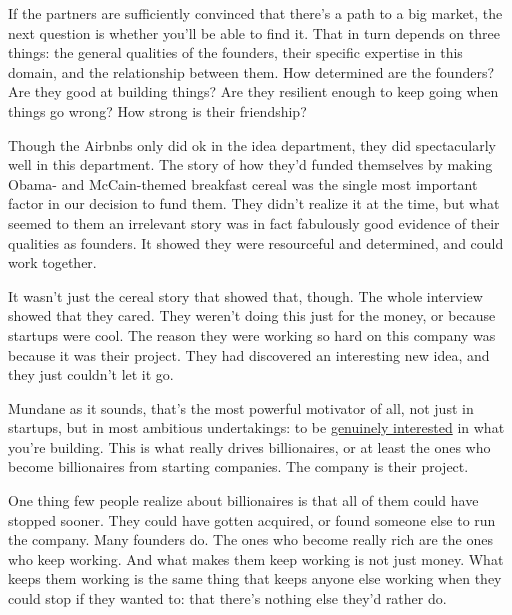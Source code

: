\documentclass[12pt]{book}
\begin{document}
If the partners are sufficiently convinced that there's a path to a big
market, the next question is whether you'll be able to find it. That in
turn depends on three things: the general qualities of the founders,
their specific expertise in this domain, and the relationship between
them. How determined are the founders? Are they good at building things?
Are they resilient enough to keep going when things go wrong? How strong
is their friendship?

Though the Airbnbs only did ok in the idea department, they did
spectacularly well in this department. The story of how they'd funded
themselves by making Obama- and McCain-themed breakfast cereal was the
single most important factor in our decision to fund them. They didn't
realize it at the time, but what seemed to them an irrelevant story was
in fact fabulously good evidence of their qualities as founders. It
showed they were resourceful and determined, and could work together.

It wasn't just the cereal story that showed that, though. The whole
interview showed that they cared. They weren't doing this just for the
money, or because startups were cool. The reason they were working so
hard on this company was because it was their project. They had
discovered an interesting new idea, and they just couldn't let it go.

Mundane as it sounds, that's the most powerful motivator of all, not
just in startups, but in most ambitious undertakings: to be
\href{genius.html}{genuinely interested} in what you're building. This
is what really drives billionaires, or at least the ones who become
billionaires from starting companies. The company is their project.

One thing few people realize about billionaires is that all of them
could have stopped sooner. They could have gotten acquired, or found
someone else to run the company. Many founders do. The ones who become
really rich are the ones who keep working. And what makes them keep
working is not just money. What keeps them working is the same thing
that keeps anyone else working when they could stop if they wanted to:
that there's nothing else they'd rather do.
\end{document}
